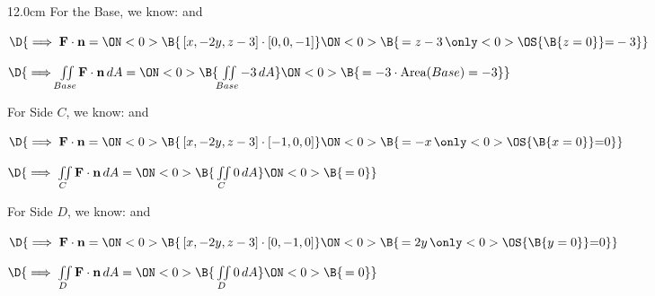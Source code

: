 \begin{frame}
\begin{columns}\begin{column}{12.0cm}
\scriptsize
For the Base, we know: \quad 
{} \quad and \quad 
{}

\vspace{0.1cm}

$\D{\implies {\bf F} \cdot {\bf n} = 
\ON<0>{\B{ \, [x,-2y,z-3] \cdot [0,0,-1]}}
\ON<0>{\B{\, = z - 3 \,\only<0>{\OS{\B{ z=0 }}}{ = } -3}}}$ 

\vspace{0.2cm}

$\D{\implies \iint \limits_{Base} {\bf F} \cdot {\bf n}\, dA = 
\ON<0>{\B{\, \iint \limits_{Base} -3 \, dA }}
\ON<0>{\B{\, = -3 \cdot \text{Area}(Base) = -3}}}$ 

\vspace{0.4cm}

For Side $C$, we know: \quad 
{} \quad and \quad 
{}

\vspace{0.1cm}

$\D{\implies {\bf F} \cdot {\bf n} = 
\ON<0>{\B{ \, [x,-2y,z-3] \cdot [-1,0,0]}}
\ON<0>{\B{\, = -x \,\only<0>{\OS{\B{ x=0 }}}{ = } 0}}}$ 

\vspace{0.2cm}

$\D{\implies \iint \limits_{C} {\bf F} \cdot {\bf n}\, dA = 
\ON<0>{\B{\, \iint \limits_{C} 0 \, dA }}
\ON<0>{\B{\, = 0}}}$

\vspace{0.4cm}

For Side $D$, we know: \quad 
{} \quad and \quad 
{}

\vspace{0.1cm}

$\D{\implies {\bf F} \cdot {\bf n} = 
\ON<0>{\B{ \, [x,-2y,z-3] \cdot [0,-1,0]}}
\ON<0>{\B{\, = 2y \,\only<0>{\OS{\B{ y=0 }}}{ = } 0}}}$ 

\vspace{0.2cm}

$\D{\implies \iint \limits_{D} {\bf F} \cdot {\bf n}\, dA = 
\ON<0>{\B{\, \iint \limits_{D} 0 \, dA }}
\ON<0>{\B{\, = 0}}}$

\vspace{0.4cm}


\end{column}
\end{columns}
\end{frame}

